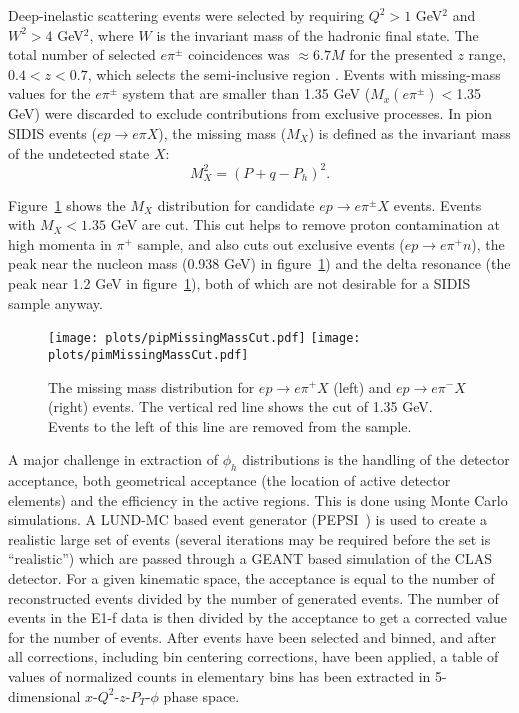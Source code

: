 \documentclass[aps,prl,twocolumn,showpacs,superscriptaddress,groupedaddress]{revtex4}  %
\newcommand{\ph}{\phi_h}
\begin{document}
Deep-inelastic scattering events were selected by requiring $Q^2>1$ GeV$^2$ and  $W^2>4$ GeV$^2$,
where $W$ is the invariant mass of the hadronic final state. 
The total number of selected $e\pi^\pm$ coincidences was $\approx 6.7M$ for the presented $z$ range, $0.4<z<0.7$, which selects the semi-inclusive region \cite{Avakian:2010ae}.
Events with missing-mass values for the $e\pi^\pm$ system that are smaller 
than 1.35 GeV ($M_{x}(e\pi^\pm)<$1.35 GeV) were discarded to exclude contributions from exclusive processes. 
In pion SIDIS events ($ep \rightarrow e\pi X$), the missing mass ($M_X$) is defined as the invariant mass of the undetected state $X$:
\begin{equation}
\label{eq:missingMassDefinition}
M_X^2 = \left( P + q - P_h \right)^2.
\end{equation}

Figure~\ref{fig:pipMissingMassCut} shows the $M_X$ distribution for candidate $ep \rightarrow e\pi^\pm X$ events.
Events with $M_X < 1.35$ GeV are cut.
This cut helps to remove proton contamination at high momenta in $\pi^+$ sample,  and also cuts out exclusive events ($ep \rightarrow e\pi^+ n$), the peak near the nucleon mass (0.938 GeV) in figure~\ref{fig:pipMissingMassCut}) and the delta resonance (the peak near 1.2 GeV in figure~\ref{fig:pipMissingMassCut}), both of which are not desirable for a SIDIS sample anyway.
\begin{figure}[htp]
\centering
\texttt{[image: plots/pipMissingMassCut.pdf]}
\texttt{[image: plots/pimMissingMassCut.pdf]}
\caption{The missing mass distribution for $ep \rightarrow e\pi^+ X$ (left) and  $ep \rightarrow e\pi^- X$ (right) events. 
The vertical red line shows the cut of 1.35 GeV. Events to the left of this line are removed from the sample.}
\label{fig:pipMissingMassCut}
\end{figure}
%

A major challenge in extraction of $\phi_h$ distributions is the handling of the detector acceptance, both geometrical acceptance (the location of active detector elements) and the efficiency in the active regions.
This is done using Monte Carlo simulations.
A LUND-MC based event generator (PEPSI~\cite{Mankiewicz:1991dp}) is used to create a realistic large set of events (several iterations may be required before the set is ``realistic'') which are passed through a GEANT based simulation of the CLAS detector.
For a given kinematic space, the acceptance is equal to the number of reconstructed events divided by the number of generated events.
The number of events in the E1-f data is then divided by the acceptance to get a corrected value for the number of events.
After events have been selected and binned, and after all corrections, including bin centering corrections,  have been applied, 
a table of values of normalized counts in elementary bins has been extracted in 5-dimensional $x$-$Q^2$-$z$-$P_T$-$\phi$ phase space.
\end{document}
